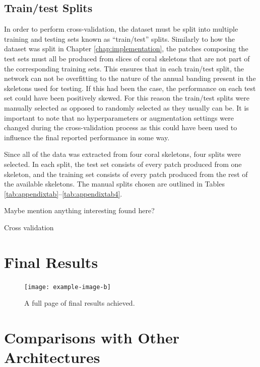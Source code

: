 \subsection{Train/test Splits}

In order to perform cross-validation, the dataset must be split into multiple training and testing sets known as ``train/test'' splits. Similarly to how the dataset was split in Chapter \ref{chap:implementation}, the patches composing the test sets must all be produced from slices of coral skeletons that are not part of the corresponding training sets. This ensures that in each train/test split, the network can not be overfitting to the nature of the annual banding present in the skeletons used for testing. If this had been the case, the performance on each test set could have been positively skewed. For this reason the train/test splits were manually selected as opposed to randomly selected as they usually can be. It is important to note that no hyperparameters or augmentation settings were changed during the cross-validation process as this could have been used to influence the final reported performance in some way.

Since all of the data was extracted from four coral skeletons, four splits were selected. In each split, the test set consists of every patch produced from one skeleton, and the training set consists of every patch produced from the rest of the available skeletons. The manual splits chosen are outlined in Tables \ref{tab:appendixtab}--\ref{tab:appendixtab4}.

Maybe mention anything interesting found here?

\begin{table}[!t]
\centering
\caption{Cross validation}

\label{tab:crossval}
\end{table}

\section{Final Results}

\begin{figure}[!p]
    \centering
    \texttt{[image: example-image-b]}
    \caption{A full page of final results achieved.}
    \label{fig:finalresults}
\end{figure}

\section{Comparisons with Other Architectures}

